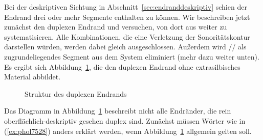 Bei der deskriptiven Sichtung in Abschnitt~\ref{sec:endranddeskriptiv} schien der Endrand drei oder mehr Segmente enthalten zu können.
Wir beschreiben jetzt zunächst den duplexen Endrand und versuchen, von dort aus weiter zu systematisieren.
Alle Kombinationen, die eine Verletzung der Sonoritätskontur darstellen würden, werden dabei gleich ausgeschlossen.
Außerdem wird // als zugrundeliegendes Segment aus dem System eliminiert (mehr dazu weiter unten).
Es ergibt sich Abbildung~\ref{fig:endranduplex}, die den duplexen Endrand ohne extrasilbisches Material abbildet.

\begin{figure}
  \caption{Struktur des duplexen Endrands}
  \label{fig:endranduplex}
\end{figure}

Das Diagramm in Abbildung~\ref{fig:endranduplex} beschreibt nicht alle Endränder, die rein oberflächlich-deskriptiv gesehen duplex sind.
Zunächst müssen Wörter wie in (\ref{ex:phol7528}) anders erklärt werden, wenn Abbildung~\ref{fig:endranduplex} allgemein gelten soll.

\begin{exe}
  \ex \label{ex:phol7528}
  \begin{xlist}
  \end{xlist}
\end{exe}

